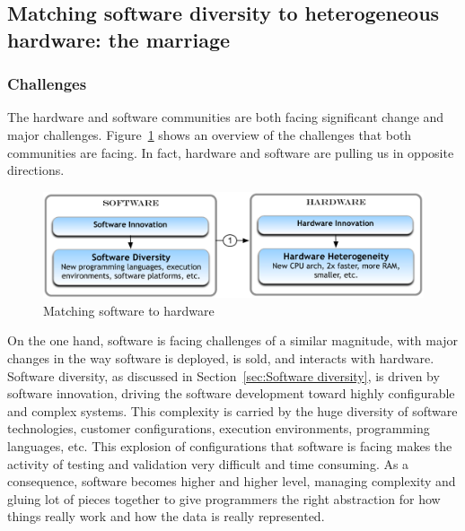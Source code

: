 


\subsection{Matching software diversity to heterogeneous hardware: the marriage}
\subsubsection{Challenges}
The hardware and software communities are both facing significant change and major challenges. Figure~\ref{fig:marriage} shows an overview of the challenges that both communities are facing. In fact, hardware and software are pulling us in opposite directions. 

\begin{figure}[h]
	\center
	\includegraphics[scale=0.65]{Background/fig/marriage}
	\caption{Matching software to hardware}
	\label{fig:marriage}
\end{figure}


On the one hand, software is facing challenges of a similar magnitude, with major changes in the way software is deployed, is sold, and interacts with hardware. 
Software diversity, as discussed in Section~\ref{sec:Software diversity}, is driven by software innovation, driving the software development toward highly configurable and complex systems. This complexity is carried by the huge diversity of software technologies, customer configurations, execution environments, programming languages, etc. This explosion of configurations that software is facing makes the activity of testing and validation very difficult and time consuming. 
As a consequence, software becomes higher and higher level, managing complexity and gluing lot of pieces together to give programmers the right abstraction for how things really work and how the data is really represented. 


